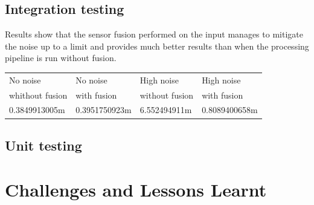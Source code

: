 \documentclass[prodmode,acmtosem]{acmsmall} %
\begin{document}
\subsection{Integration testing}
Results show that the sensor fusion performed on the input manages to mitigate the noise up to a limit and provides much better results than when the processing pipeline is run without fusion.

\begin{center}
\begin{tabularx}{\textwidth}{| X | X | X | X |} 
\hline
No noise & No noise  & High noise  & High noise  \\
whithout fusion & with fusion & without fusion & with fusion \\
\hline
0.3849913005m & 0.3951750923m & 6.552494911m & 0.8089400658m \\
\hline
\hline
\end{tabularx}
\label{tab:performance}
\end{center}

\subsection{Unit testing}




\section{Challenges and Lessons Learnt}
\end{document}
